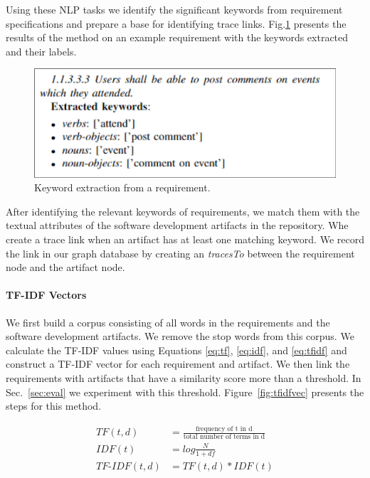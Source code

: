   Using these NLP tasks we identify the significant keywords from requirement specifications and prepare a base for identifying trace links. Fig.\ref{fig:keywords} presents the results of the method on an example requirement with the keywords extracted and their labels.

  \begin{figure}[htb]
    \centering
    \includegraphics[width=.96\linewidth]{figs/keywords.png}
    \caption{Keyword extraction from a requirement.}
    \label{fig:keywords}
  \end{figure}

  After identifying the relevant keywords of requirements, we match them with the textual attributes of the software development artifacts in the repository. Whe create a trace link when an artifact has at least one matching keyword. We record the link in our graph database by creating an \emph{tracesTo} between the requirement node and the artifact node.

  \paragraph{TF-IDF Vectors} We first build a corpus consisting of all words in the requirements and the software development artifacts. We remove the stop words from this corpus. We calculate the TF-IDF values using Equations \ref{eq:tf}, \ref{eq:idf}, and \ref{eq:tfidf} and construct a TF-IDF vector for each requirement and artifact. We then link the requirements with artifacts that have a similarity score more than a threshold. In Sec.~\ref{sec:eval} we experiment with this threshold. Figure~\ref{fig:tfidfvec} presents the steps for this method.

  \begin{align}
    TF(t,d) &= \frac{\text{frequency of t in d}}{\text{total number of terms in d}} \label{eq:tf} \\
    IDF(t) &= log\frac{N}{1+df} \label{eq:idf}\\
    TF\text{-}IDF(t,d) &= TF(t,d)*IDF(t) \label{eq:tfidf}
  \end{align}

